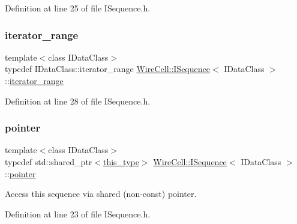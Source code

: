 Definition at line 25 of file I\+Sequence.\+h.

\mbox{\label{class_wire_cell_1_1_i_sequence_ac49f0584f3aaafc13a525953ebafad95}} 
\subsubsection{\texorpdfstring{iterator\+\_\+range}{iterator\_range}}
{\footnotesize\ttfamily template$<$class I\+Data\+Class$>$ \\
typedef I\+Data\+Class\+::iterator\+\_\+range \hyperlink{class_wire_cell_1_1_i_sequence}{Wire\+Cell\+::\+I\+Sequence}$<$ I\+Data\+Class $>$\+::\hyperlink{class_wire_cell_1_1_i_sequence_ac49f0584f3aaafc13a525953ebafad95}{iterator\+\_\+range}}



Definition at line 28 of file I\+Sequence.\+h.

\mbox{\label{class_wire_cell_1_1_i_sequence_aad75bbc31a91c10119d21d458129c05c}} 
\subsubsection{\texorpdfstring{pointer}{pointer}}
{\footnotesize\ttfamily template$<$class I\+Data\+Class$>$ \\
typedef std\+::shared\+\_\+ptr$<$\hyperlink{class_wire_cell_1_1_i_sequence_aae676a1415a6c843082041fb7f38b963}{this\+\_\+type}$>$ \hyperlink{class_wire_cell_1_1_i_sequence}{Wire\+Cell\+::\+I\+Sequence}$<$ I\+Data\+Class $>$\+::\hyperlink{class_wire_cell_1_1_i_sequence_aad75bbc31a91c10119d21d458129c05c}{pointer}}



Access this sequence via shared (non-\/const) pointer. 



Definition at line 23 of file I\+Sequence.\+h.

\mbox{\label{class_wire_cell_1_1_i_sequence_aae676a1415a6c843082041fb7f38b963}} 
